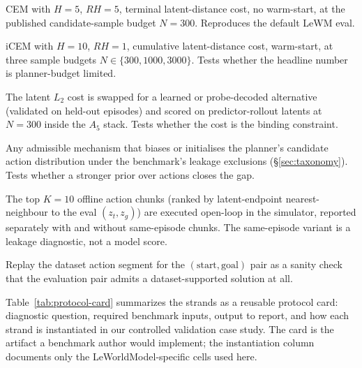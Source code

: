 \documentclass{article}
\begin{document}
\begin{description}[itemsep=2pt,topsep=2pt,leftmargin=2em]
\item[Published-style cell ($A_0$).] CEM with $H{=}5$, $RH{=}5$, terminal latent-distance cost, no warm-start, at the published candidate-sample budget $N{=}300$. Reproduces the default LeWM eval.
\item[Compute frontier ($A_5$).] iCEM with $H{=}10$, $RH{=}1$, cumulative latent-distance cost, warm-start, at three sample budgets $N \in \{300, 1000, 3000\}$. Tests whether the headline number is planner-budget limited.
\item[Cost-replacement controls.] The latent $L_2$ cost is swapped for a learned or probe-decoded alternative (validated on held-out episodes) and scored on predictor-rollout latents at $N{=}300$ inside the $A_5$ stack. Tests whether the cost is the binding constraint.
\item[Action-prior hook.] Any admissible mechanism that biases or initialises the planner's candidate action distribution under the benchmark's leakage exclusions (\S\ref{sec:taxonomy}). Tests whether a stronger prior over actions closes the gap.
\item[Retrieval-only leakage baseline.] The top $K{=}10$ offline action chunks (ranked by latent-endpoint nearest-neighbour to the eval $(z_t, z_g)$) are executed open-loop in the simulator, reported separately with and without same-episode chunks. The same-episode variant is a leakage diagnostic, not a model score.
\item[Expert replay.] Replay the dataset action segment for the $(\text{start}, \text{goal})$ pair as a sanity check that the evaluation pair admits a dataset-supported solution at all.
\end{description}

Table~\ref{tab:protocol-card} summarizes the strands as a reusable protocol card: diagnostic question, required benchmark inputs, output to report, and how each strand is instantiated in our controlled validation case study. The card is the artifact a benchmark author would implement; the instantiation column documents only the LeWorldModel-specific cells used here.
\end{document}
